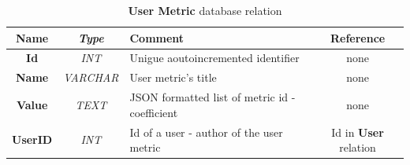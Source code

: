 	\begin{table}[t!]
		\centering
		\begin{tabular}{| >{\bf}c | >{\em}c | l | c |} 
			\hline
			Name	& Type			& Comment												& Reference						\\ \hline
			Id		& INT			& Unigue aoutoincremented identifier					& none							\\
			Name	& VARCHAR		& User metric's title									& none							\\
			Value	& TEXT			& JSON formatted list of metric id - coefficient		& none							\\
			UserID	& INT			& Id of a user - author of the user metric				& Id in \textbf{User} relation	\\
			\hline
		\end{tabular}
		\caption{\textbf{User Metric} database relation}
		\label{umetrictable}
	\end{table}